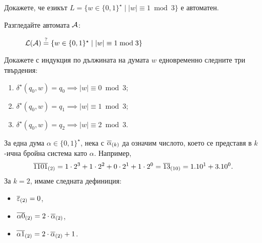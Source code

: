 \begin{problem}
  Докажете, че езикът $L = \{w \in \{0,1\}^\star \mid |w| \equiv 1 \bmod 3\}$ е автоматен.
\end{problem}
\begin{hint}
  Разгледайте автомата $\mathcal{A}$:
  \begin{figure}[H]
    \begin{center}
      \end{center}
      \caption{$\mathcal{L}(\mathcal{A}) \stackrel{?}{=} \{w\in\{0,1\}^\star \mid |w| \equiv 1 \bmod 3\}$}
 \end{figure}  
 Докажете с индукция по дължината на думата $w$ едновременно следните три твърдения:
 \begin{enumerate}[(1)]
 \item
   $\delta^\star(q_0, w) = q_0 \implies |w| \equiv 0 \bmod 3$;
 \item 
   $\delta^\star(q_0, w) = q_1 \implies |w| \equiv 1 \bmod 3$;
 \item
   $\delta^\star(q_0, w) = q_2 \implies |w| \equiv 2 \bmod 3$.
 \end{enumerate}
\end{hint}

За една дума $\alpha \in \{0,1\}^\star$, 
нека с $\overline{\alpha}_{(k)}$ да означим числото, което се представя в $k$-ична бройна система като $\alpha$.
Например, 
\[\overline{1101}_{(2)} = 1 \cdot 2^3+1\cdot 2^2+0\cdot 2^1+1\cdot 2^0 = \overline{13}_{(10)} = 1.10^1 + 3.10^0.\]
За $k = 2$, имаме следната дефиниция:
\begin{itemize}
\item
  $\overline{\varepsilon}_{(2)} = 0$,
\item
  $\overline{\alpha 0}_{(2)} = 2\cdot \overline{\alpha}_{(2)}$,
\item
  $\overline{\alpha 1}_{(2)} = 2\cdot \overline{\alpha}_{(2)} + 1$.
\end{itemize}

